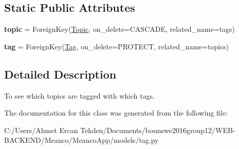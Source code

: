 \subsection*{Static Public Attributes}
\begin{DoxyCompactItemize}
\item 
\hypertarget{class_meanco_app_1_1models_1_1tag_1_1_of_topic_a3f9b9afe05d2e08cec3c5271950b915f}{}\label{class_meanco_app_1_1models_1_1tag_1_1_of_topic_a3f9b9afe05d2e08cec3c5271950b915f} 
{\bfseries topic} = Foreign\+Key(\hyperlink{class_meanco_app_1_1models_1_1topic_1_1_topic}{Topic}, on\+\_\+delete=C\+A\+S\+C\+A\+DE, related\+\_\+name=\textquotesingle{}tags\textquotesingle{})
\item 
\hypertarget{class_meanco_app_1_1models_1_1tag_1_1_of_topic_a52f375a00cec9502bebfda94dded1d50}{}\label{class_meanco_app_1_1models_1_1tag_1_1_of_topic_a52f375a00cec9502bebfda94dded1d50} 
{\bfseries tag} = Foreign\+Key(\hyperlink{class_meanco_app_1_1models_1_1tag_1_1_tag}{Tag}, on\+\_\+delete=P\+R\+O\+T\+E\+CT, related\+\_\+name=\textquotesingle{}topics\textquotesingle{})
\end{DoxyCompactItemize}


\subsection{Detailed Description}
To see which topics are tagged with which tags. 



The documentation for this class was generated from the following file\+:\begin{DoxyCompactItemize}
\item 
C\+:/\+Users/\+Ahmet Ercan Tekden/\+Documents/bounswe2016group12/\+W\+E\+B-\/\+B\+A\+C\+K\+E\+N\+D/\+Meanco/\+Meanco\+App/models/tag.\+py\end{DoxyCompactItemize}
